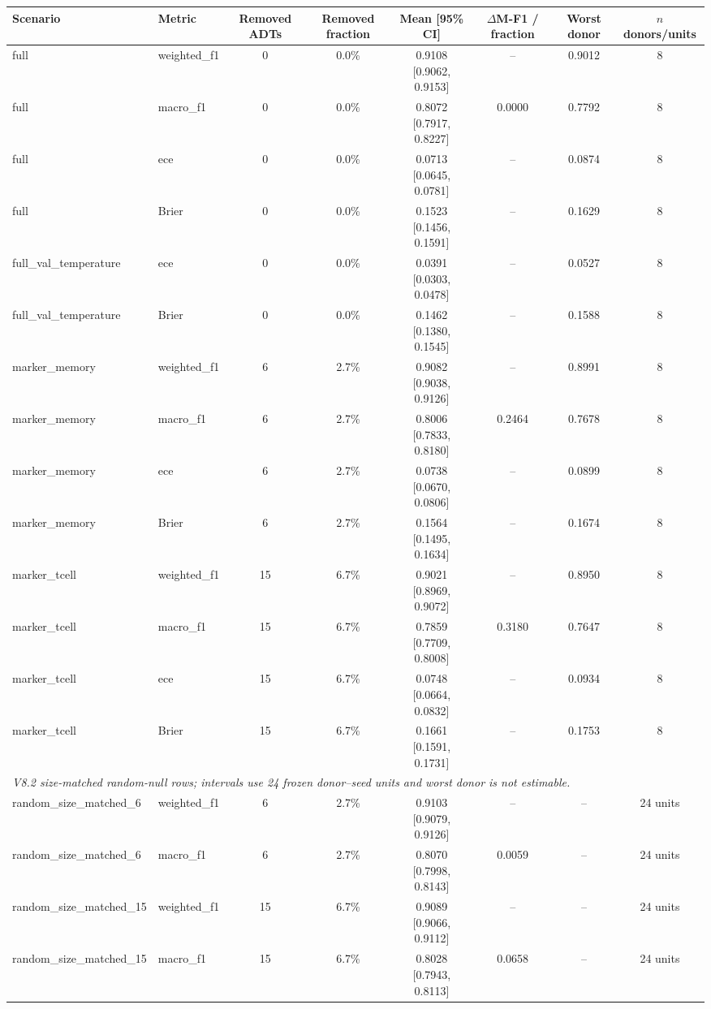 \begin{tabular}{llcccccc}
\toprule
Scenario & Metric & Removed ADTs & Removed fraction & Mean [95\% CI] & $\Delta$M-F1 / fraction & Worst donor & $n$ donors/units \\
\midrule
full & weighted\_f1 & 0 & 0.0\% & 0.9108 [0.9062, 0.9153] & -- & 0.9012 & 8 \\
full & macro\_f1 & 0 & 0.0\% & 0.8072 [0.7917, 0.8227] & 0.0000 & 0.7792 & 8 \\
full & ece & 0 & 0.0\% & 0.0713 [0.0645, 0.0781] & -- & 0.0874 & 8 \\
full & Brier & 0 & 0.0\% & 0.1523 [0.1456, 0.1591] & -- & 0.1629 & 8 \\
full\_val\_temperature & ece & 0 & 0.0\% & 0.0391 [0.0303, 0.0478] & -- & 0.0527 & 8 \\
full\_val\_temperature & Brier & 0 & 0.0\% & 0.1462 [0.1380, 0.1545] & -- & 0.1588 & 8 \\
marker\_memory & weighted\_f1 & 6 & 2.7\% & 0.9082 [0.9038, 0.9126] & -- & 0.8991 & 8 \\
marker\_memory & macro\_f1 & 6 & 2.7\% & 0.8006 [0.7833, 0.8180] & 0.2464 & 0.7678 & 8 \\
marker\_memory & ece & 6 & 2.7\% & 0.0738 [0.0670, 0.0806] & -- & 0.0899 & 8 \\
marker\_memory & Brier & 6 & 2.7\% & 0.1564 [0.1495, 0.1634] & -- & 0.1674 & 8 \\
marker\_tcell & weighted\_f1 & 15 & 6.7\% & 0.9021 [0.8969, 0.9072] & -- & 0.8950 & 8 \\
marker\_tcell & macro\_f1 & 15 & 6.7\% & 0.7859 [0.7709, 0.8008] & 0.3180 & 0.7647 & 8 \\
marker\_tcell & ece & 15 & 6.7\% & 0.0748 [0.0664, 0.0832] & -- & 0.0934 & 8 \\
marker\_tcell & Brier & 15 & 6.7\% & 0.1661 [0.1591, 0.1731] & -- & 0.1753 & 8 \\
\multicolumn{8}{l}{\emph{V8.2 size-matched random-null rows; intervals use 24 frozen donor--seed units and worst donor is not estimable.}} \\
random\_size\_matched\_6 & weighted\_f1 & 6 & 2.7\% & 0.9103 [0.9079, 0.9126] & -- & -- & 24 units \\
random\_size\_matched\_6 & macro\_f1 & 6 & 2.7\% & 0.8070 [0.7998, 0.8143] & 0.0059 & -- & 24 units \\
random\_size\_matched\_15 & weighted\_f1 & 15 & 6.7\% & 0.9089 [0.9066, 0.9112] & -- & -- & 24 units \\
random\_size\_matched\_15 & macro\_f1 & 15 & 6.7\% & 0.8028 [0.7943, 0.8113] & 0.0658 & -- & 24 units \\

\end{tabular}
